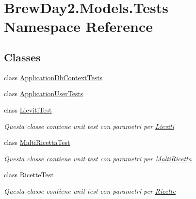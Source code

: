 \hypertarget{namespace_brew_day2_1_1_models_1_1_tests}{}\section{Brew\+Day2.\+Models.\+Tests Namespace Reference}
\label{namespace_brew_day2_1_1_models_1_1_tests}
\subsection*{Classes}
\begin{DoxyCompactItemize}
\item 
class \mbox{\hyperlink{class_brew_day2_1_1_models_1_1_tests_1_1_application_db_context_tests}{Application\+Db\+Context\+Tests}}
\item 
class \mbox{\hyperlink{class_brew_day2_1_1_models_1_1_tests_1_1_application_user_tests}{Application\+User\+Tests}}
\item 
class \mbox{\hyperlink{class_brew_day2_1_1_models_1_1_tests_1_1_lieviti_test}{Lieviti\+Test}}
\begin{DoxyCompactList}\small\item\em Questa classe contiene unit test con parametri per \mbox{\hyperlink{class_brew_day2_1_1_models_1_1_lieviti}{Lieviti}}\end{DoxyCompactList}\item 
class \mbox{\hyperlink{class_brew_day2_1_1_models_1_1_tests_1_1_malti_ricetta_test}{Malti\+Ricetta\+Test}}
\begin{DoxyCompactList}\small\item\em Questa classe contiene unit test con parametri per \mbox{\hyperlink{class_brew_day2_1_1_models_1_1_malti_ricetta}{Malti\+Ricetta}}\end{DoxyCompactList}\item 
class \mbox{\hyperlink{class_brew_day2_1_1_models_1_1_tests_1_1_ricette_test}{Ricette\+Test}}
\begin{DoxyCompactList}\small\item\em Questa classe contiene unit test con parametri per \mbox{\hyperlink{class_brew_day2_1_1_models_1_1_ricette}{Ricette}}\end{DoxyCompactList}\end{DoxyCompactItemize}
